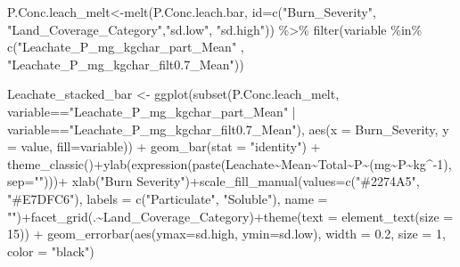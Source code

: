 \documentclass[
]{article}
\newenvironment{Shaded}{\begin{snugshade}}{\end{snugshade}}
\newcommand{\AttributeTok}[1]{\textcolor[rgb]{0.77,0.63,0.00}{#1}}
\newcommand{\DecValTok}[1]{\textcolor[rgb]{0.00,0.00,0.81}{#1}}
\newcommand{\FloatTok}[1]{\textcolor[rgb]{0.00,0.00,0.81}{#1}}
\newcommand{\FunctionTok}[1]{\textcolor[rgb]{0.00,0.00,0.00}{#1}}
\newcommand{\NormalTok}[1]{#1}
\newcommand{\OtherTok}[1]{\textcolor[rgb]{0.56,0.35,0.01}{#1}}
\newcommand{\SpecialCharTok}[1]{\textcolor[rgb]{0.00,0.00,0.00}{#1}}
\newcommand{\StringTok}[1]{\textcolor[rgb]{0.31,0.60,0.02}{#1}}
\begin{document}
\begin{Shaded}
\begin{Highlighting}[]
\NormalTok{P.Conc.leach\_melt}\OtherTok{\textless{}{-}}\FunctionTok{melt}\NormalTok{(P.Conc.leach.bar, }\AttributeTok{id=}\FunctionTok{c}\NormalTok{(}\StringTok{"Burn\_Severity"}\NormalTok{, }\StringTok{"Land\_Coverage\_Category"}\NormalTok{,}\StringTok{"sd.low"}\NormalTok{, }\StringTok{"sd.high"}\NormalTok{)) }\SpecialCharTok{\%\textgreater{}\%}
  \FunctionTok{filter}\NormalTok{(variable }\SpecialCharTok{\%in\%} \FunctionTok{c}\NormalTok{(}\StringTok{"Leachate\_P\_mg\_kgchar\_part\_Mean"}\NormalTok{ , }\StringTok{"Leachate\_P\_mg\_kgchar\_filt0.7\_Mean"}\NormalTok{))}


\NormalTok{Leachate\_stacked\_bar }\OtherTok{\textless{}{-}} \FunctionTok{ggplot}\NormalTok{(}\FunctionTok{subset}\NormalTok{(P.Conc.leach\_melt, variable}\SpecialCharTok{==}\StringTok{"Leachate\_P\_mg\_kgchar\_part\_Mean"} \SpecialCharTok{|}\NormalTok{ variable}\SpecialCharTok{==}\StringTok{"Leachate\_P\_mg\_kgchar\_filt0.7\_Mean"}\NormalTok{), }\FunctionTok{aes}\NormalTok{(}\AttributeTok{x =}\NormalTok{ Burn\_Severity, }\AttributeTok{y =}\NormalTok{ value, }\AttributeTok{fill=}\NormalTok{variable)) }\SpecialCharTok{+} \FunctionTok{geom\_bar}\NormalTok{(}\AttributeTok{stat =} \StringTok{"identity"}\NormalTok{)  }\SpecialCharTok{+} \FunctionTok{theme\_classic}\NormalTok{()}\SpecialCharTok{+}\FunctionTok{ylab}\NormalTok{(}\FunctionTok{expression}\NormalTok{(}\FunctionTok{paste}\NormalTok{(Leachate}\SpecialCharTok{\textasciitilde{}}\NormalTok{Mean}\SpecialCharTok{\textasciitilde{}}\NormalTok{Total}\SpecialCharTok{\textasciitilde{}}\NormalTok{P}\SpecialCharTok{\textasciitilde{}}\NormalTok{(mg}\SpecialCharTok{\textasciitilde{}}\NormalTok{P}\SpecialCharTok{\textasciitilde{}}\NormalTok{kg}\SpecialCharTok{\^{}{-}}\DecValTok{1}\NormalTok{), }\AttributeTok{sep=}\StringTok{""}\NormalTok{)))}\SpecialCharTok{+} \FunctionTok{xlab}\NormalTok{(}\StringTok{"Burn Severity"}\NormalTok{)}\SpecialCharTok{+}\FunctionTok{scale\_fill\_manual}\NormalTok{(}\AttributeTok{values=}\FunctionTok{c}\NormalTok{(}\StringTok{"\#2274A5"}\NormalTok{, }\StringTok{"\#E7DFC6"}\NormalTok{), }\AttributeTok{labels =} \FunctionTok{c}\NormalTok{(}\StringTok{"Particulate"}\NormalTok{, }\StringTok{"Soluble"}\NormalTok{), }\AttributeTok{name =} \StringTok{""}\NormalTok{)}\SpecialCharTok{+}\FunctionTok{facet\_grid}\NormalTok{(.}\SpecialCharTok{\textasciitilde{}}\NormalTok{Land\_Coverage\_Category)}\SpecialCharTok{+}\FunctionTok{theme}\NormalTok{(}\AttributeTok{text =} \FunctionTok{element\_text}\NormalTok{(}\AttributeTok{size =} \DecValTok{15}\NormalTok{)) }\SpecialCharTok{+} \FunctionTok{geom\_errorbar}\NormalTok{(}\FunctionTok{aes}\NormalTok{(}\AttributeTok{ymax=}\NormalTok{sd.high, }\AttributeTok{ymin=}\NormalTok{sd.low), }\AttributeTok{width =} \FloatTok{0.2}\NormalTok{, }\AttributeTok{size =} \DecValTok{1}\NormalTok{, }\AttributeTok{color =} \StringTok{"black"}\NormalTok{)}
\end{Highlighting}
\end{Shaded}
\end{document}
